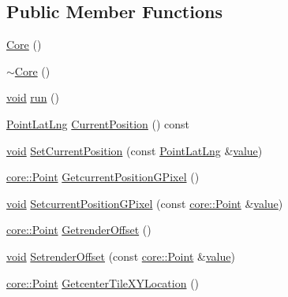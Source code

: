 \subsection*{Public Member Functions}
\begin{DoxyCompactItemize}
\item 
\hyperlink{group___o_p_map_widget_ga7ec14a145f0d7ff3036d68814659e27d}{Core} ()
\item 
\hyperlink{group___o_p_map_widget_ga6ad5ec431c303aa0ea029c86fc7a5728}{$\sim$\-Core} ()
\item 
\hyperlink{group___u_a_v_objects_plugin_ga444cf2ff3f0ecbe028adce838d373f5c}{void} \hyperlink{group___o_p_map_widget_ga0d0ab90f1256808e363cd35dd5f2fa7f}{run} ()
\item 
\hyperlink{structinternals_1_1_point_lat_lng}{Point\-Lat\-Lng} \hyperlink{group___o_p_map_widget_ga44a14bf2d358ec5f93c7a99416e20732}{Current\-Position} () const 
\item 
\hyperlink{group___u_a_v_objects_plugin_ga444cf2ff3f0ecbe028adce838d373f5c}{void} \hyperlink{group___o_p_map_widget_ga4e5d816fef373048f1109beac294521c}{Set\-Current\-Position} (const \hyperlink{structinternals_1_1_point_lat_lng}{Point\-Lat\-Lng} \&\hyperlink{glext_8h_aa0e2e9cea7f208d28acda0480144beb0}{value})
\item 
\hyperlink{structcore_1_1_point}{core\-::\-Point} \hyperlink{group___o_p_map_widget_ga705325edd0aba942d5a67990c7d07136}{Getcurrent\-Position\-G\-Pixel} ()
\item 
\hyperlink{group___u_a_v_objects_plugin_ga444cf2ff3f0ecbe028adce838d373f5c}{void} \hyperlink{group___o_p_map_widget_ga68af707707e7a27c72969b84ffcdc206}{Setcurrent\-Position\-G\-Pixel} (const \hyperlink{structcore_1_1_point}{core\-::\-Point} \&\hyperlink{glext_8h_aa0e2e9cea7f208d28acda0480144beb0}{value})
\item 
\hyperlink{structcore_1_1_point}{core\-::\-Point} \hyperlink{group___o_p_map_widget_gae32df0621adec51500130103787bf6a0}{Getrender\-Offset} ()
\item 
\hyperlink{group___u_a_v_objects_plugin_ga444cf2ff3f0ecbe028adce838d373f5c}{void} \hyperlink{group___o_p_map_widget_ga78c39b61dd28bb05639737d0e72576fe}{Setrender\-Offset} (const \hyperlink{structcore_1_1_point}{core\-::\-Point} \&\hyperlink{glext_8h_aa0e2e9cea7f208d28acda0480144beb0}{value})
\item 
\hyperlink{structcore_1_1_point}{core\-::\-Point} \hyperlink{group___o_p_map_widget_gad81fc0035925c351630e24e790d7df2d}{Getcenter\-Tile\-X\-Y\-Location} ()
\item 

\end{DoxyCompactItemize}
